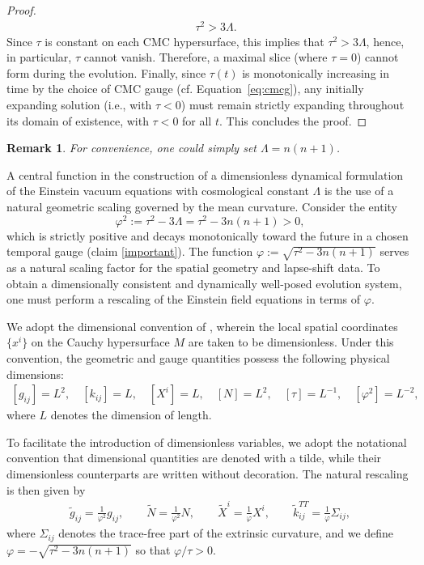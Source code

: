 \documentclass{amsart}
\newtheorem{remark}{Remark}
\begin{document}
\begin{proof}
\begin{align}
\quad \tau^2 > 3\Lambda.
\end{align}
Since $\tau$ is constant on each CMC hypersurface, this implies that $\tau^{2}>3\Lambda$, hence, in particular, $\tau$ cannot vanish. Therefore, a maximal slice (where $\tau=0$) cannot form during the evolution.
Finally, since $\tau(t)$ is monotonically increasing in time by the choice of CMC gauge (cf. Equation~\eqref{eq:cmcg}), any initially expanding solution (i.e., with $\tau<0$) must remain strictly expanding throughout its domain of existence, with $\tau<0$ for all $t$. This concludes the proof.
\end{proof}
\begin{remark}
For convenience, one could simply set $\Lambda=n(n+1)$.
\end{remark}

\noindent A central function in the construction of a dimensionless dynamical formulation of the Einstein vacuum equations with cosmological constant $\Lambda$ is the use of a natural geometric scaling governed by the mean curvature. Consider the entity
\[
\varphi^2 := \tau^2 - 3\Lambda=\tau^{2}-3n(n+1) > 0,
\]
which is strictly positive and decays monotonically toward the future in a chosen temporal gauge (claim \ref{important}). The function $\varphi := \sqrt{\tau^2 - 3n(n+1)}$ serves as a natural scaling factor for the spatial geometry and lapse-shift data. To obtain a dimensionally consistent and dynamically well-posed evolution system, one must perform a rescaling of the Einstein field equations in terms of $\varphi$.

\noindent We adopt the dimensional convention of \cite{andersson2011einstein}, wherein the local spatial coordinates $\{x^i\}$ on the Cauchy hypersurface $M$ are taken to be dimensionless. Under this convention, the geometric and gauge quantities possess the following physical dimensions:
\begin{align} \label{eq:scaling}
[g_{ij}] = L^2, \quad [k_{ij}] = L, \quad [X^i] = L, \quad [N] = L^2, \quad [\tau] = L^{-1}, \quad [\varphi^2] = L^{-2},
\end{align}
where $L$ denotes the dimension of length. 

\noindent To facilitate the introduction of dimensionless variables, we adopt the notational convention that dimensional quantities are denoted with a tilde, while their dimensionless counterparts are written without decoration. The natural rescaling is then given by
\begin{align} \label{eq:scaling}
\widetilde{g}_{ij} = \frac{1}{\varphi^2} g_{ij}, \qquad \widetilde{N} = \frac{1}{\varphi^2} N, \qquad \widetilde{X}^i = \frac{1}{\varphi} X^i, \qquad \widetilde{k}_{ij}^{TT} = \frac{1}{\varphi} \Sigma_{ij},
\end{align}
where $\Sigma_{ij}$ denotes the trace-free part of the extrinsic curvature, and we define $\varphi = -\sqrt{\tau^2 - 3n(n+1)}$ so that $\varphi / \tau > 0$.
\end{document}
